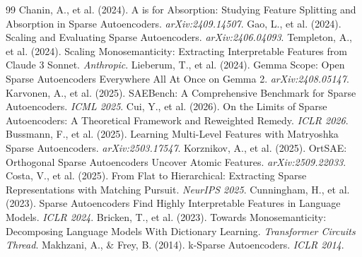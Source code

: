 \documentclass{article}
\begin{document}

\begin{thebibliography}{99}
 Chanin, A., et al. (2024). A is for Absorption: Studying Feature Splitting and Absorption in Sparse Autoencoders. \textit{arXiv:2409.14507}.
 Gao, L., et al. (2024). Scaling and Evaluating Sparse Autoencoders. \textit{arXiv:2406.04093}.
 Templeton, A., et al. (2024). Scaling Monosemanticity: Extracting Interpretable Features from Claude 3 Sonnet. \textit{Anthropic}.
 Lieberum, T., et al. (2024). Gemma Scope: Open Sparse Autoencoders Everywhere All At Once on Gemma 2. \textit{arXiv:2408.05147}.
 Karvonen, A., et al. (2025). SAEBench: A Comprehensive Benchmark for Sparse Autoencoders. \textit{ICML 2025}.
 Cui, Y., et al. (2026). On the Limits of Sparse Autoencoders: A Theoretical Framework and Reweighted Remedy. \textit{ICLR 2026}.
 Bussmann, F., et al. (2025). Learning Multi-Level Features with Matryoshka Sparse Autoencoders. \textit{arXiv:2503.17547}.
 Korznikov, A., et al. (2025). OrtSAE: Orthogonal Sparse Autoencoders Uncover Atomic Features. \textit{arXiv:2509.22033}.
 Costa, V., et al. (2025). From Flat to Hierarchical: Extracting Sparse Representations with Matching Pursuit. \textit{NeurIPS 2025}.
 Cunningham, H., et al. (2023). Sparse Autoencoders Find Highly Interpretable Features in Language Models. \textit{ICLR 2024}.
 Bricken, T., et al. (2023). Towards Monosemanticity: Decomposing Language Models With Dictionary Learning. \textit{Transformer Circuits Thread}.
 Makhzani, A., & Frey, B. (2014). k-Sparse Autoencoders. \textit{ICLR 2014}.
\end{thebibliography}
\end{document}
